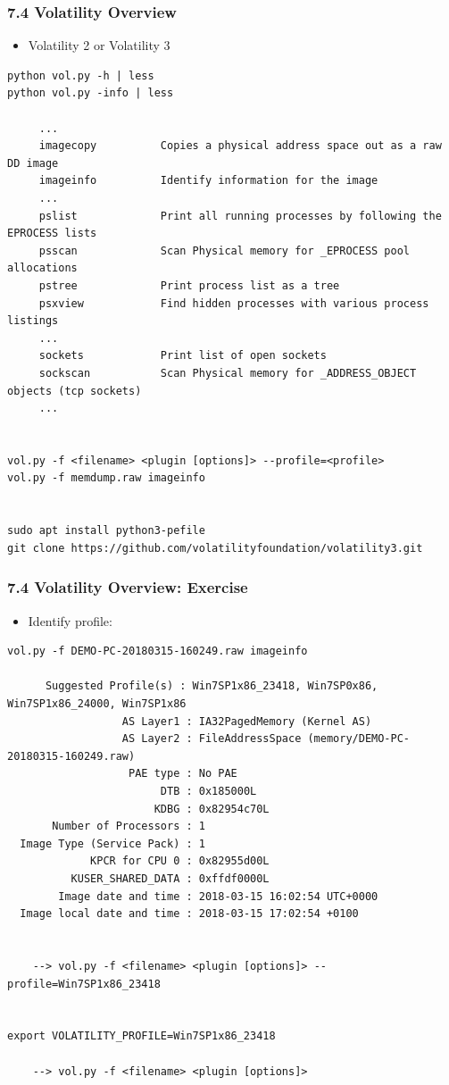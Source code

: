 \begin{frame}[fragile]
  \frametitle{7.4 Volatility Overview}
    \begin{itemize}
        \item[] Volatility 2 or Volatility 3
    \end{itemize}
    \begin{lstlisting}[basicstyle=\tiny]
python vol.py -h | less
python vol.py -info | less

     ...
     imagecopy      	Copies a physical address space out as a raw DD image
     imageinfo      	Identify information for the image
     ...
     pslist         	Print all running processes by following the EPROCESS lists 
     psscan         	Scan Physical memory for _EPROCESS pool allocations
     pstree         	Print process list as a tree
     psxview        	Find hidden processes with various process listings
     ...
     sockets        	Print list of open sockets
     sockscan       	Scan Physical memory for _ADDRESS_OBJECT objects (tcp sockets)
     ...


vol.py -f <filename> <plugin [options]> --profile=<profile>
vol.py -f memdump.raw imageinfo


sudo apt install python3-pefile
git clone https://github.com/volatilityfoundation/volatility3.git
    \end{lstlisting}
\end{frame}


\begin{frame}[fragile]
  \frametitle{7.4 Volatility Overview: Exercise}
    \begin{itemize}
        \item[] Identify profile:
    \end{itemize}
    \begin{lstlisting}[basicstyle=\tiny]
vol.py -f DEMO-PC-20180315-160249.raw imageinfo

      Suggested Profile(s) : Win7SP1x86_23418, Win7SP0x86, Win7SP1x86_24000, Win7SP1x86
                  AS Layer1 : IA32PagedMemory (Kernel AS)
                  AS Layer2 : FileAddressSpace (memory/DEMO-PC-20180315-160249.raw)
                   PAE type : No PAE
                        DTB : 0x185000L
                       KDBG : 0x82954c70L
       Number of Processors : 1
  Image Type (Service Pack) : 1
             KPCR for CPU 0 : 0x82955d00L
          KUSER_SHARED_DATA : 0xffdf0000L
        Image date and time : 2018-03-15 16:02:54 UTC+0000
  Image local date and time : 2018-03-15 17:02:54 +0100


    --> vol.py -f <filename> <plugin [options]> --profile=Win7SP1x86_23418


export VOLATILITY_PROFILE=Win7SP1x86_23418

    --> vol.py -f <filename> <plugin [options]> 
    \end{lstlisting}
\end{frame}


